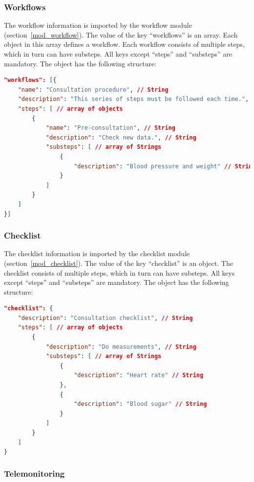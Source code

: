     \subsubsection{Workflows}
    
    The workflow information is imported by the workflow module (section~\ref{mod_workflow}). The value of the key ``workflows'' is an array. Each object in this array defines a workflow. Each workflow consists of multiple steps, which in turn can have substeps. All keys except ``steps'' and ``substeps'' are mandatory. The object has the following structure:

\begin{lstlisting}[language=json,firstnumber=1]
"workflows": [{
    "name": "Consultation procedure", // String
    "description": "This series of steps must be followed each time.", // String
    "steps": [ // array of objects
        {
            "name": "Pre-consultation", // String
            "description": "Check new data.", // String
            "substeps": [ // array of Strings
                {
                    "description": "Blood pressure and weight" // String
                }
            ]
        }
    ]
}]
\end{lstlisting}

    \subsubsection{Checklist}
    
    The checklist information is imported by the checklist module (section~\ref{mod_checklist}). The value of the key ``checklist'' is an object. The checklist consists of multiple steps, which in turn can have substeps. All keys except ``steps'' and ``substeps'' are mandatory. The object has the following structure:

\begin{lstlisting}[language=json,firstnumber=1]
"checklist": {
    "description": "Consultation checklist", // String
    "steps": [ // array of objects
        {
            "description": "Do measurements", // String
            "substeps": [ // array of Strings
                {
                    "description": "Heart rate" // String
                },
                {
                    "description": "Blood sugar" // String
                }
            ]
        }
    ]
}
\end{lstlisting}

    \subsubsection{Telemonitoring}

